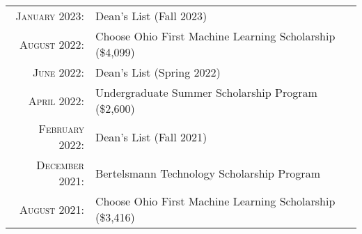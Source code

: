 \documentclass[letterpaper,8pt]{article} %
\begin{document}
\footnotesize{\begin{tabular}{rl}
\textsc{January 2023}: & Dean's List (Fall 2023)\\
\textsc{August 2022}: & Choose Ohio First Machine Learning Scholarship \footnotesize(\$4,099)\normalsize\\
\textsc{June 2022}: & Dean's List (Spring 2022)\\
\textsc{April 2022}: & Undergraduate Summer Scholarship Program \footnotesize(\$2,600)\\
\textsc{February 2022}: & Dean's List (Fall 2021)\\
\textsc{December 2021}: & Bertelsmann Technology Scholarship Program\\
\textsc{August 2021}: & Choose Ohio First Machine Learning Scholarship \footnotesize(\$3,416)\normalsize\\
\end{tabular}}\normalsize
\end{document}

